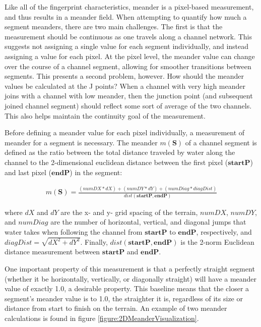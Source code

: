 Like all of the fingerprint characteristics, meander is a pixel-based measurement, and thus results in a meander field. When attempting to quantify how much a segment meanders, there are two main challenges. The first is that the measurement should be continuous as one travels along a channel network. This suggests not assigning a single value for each segment individually, and instead assigning a value for each pixel. At the pixel level, the meander value can change over the course of a channel segment, allowing for smoother transitions between segments. This presents a second problem, however. How should the meander values be calculated at the J points? When a channel with very high meander joins with a channel with low meander, then the junction point (and subsequent joined channel segment) should reflect some sort of average of the two channels. This also helps maintain the continuity goal of the measurement.

Before defining a meander value for each pixel individually, a measurement of meander for a segment is necessary. The meander $m(\textbf{S})$ of a channel segment is defined as the ratio between the total distance traveled by water along the channel to the 2-dimensional euclidean distance between the first pixel ($\textbf{startP}$) and last pixel ($\textbf{endP}$) in the segment:

\begin{align}
\label{equation:MeanderCalculation}
  m(\textbf{S}) = \displaystyle\frac{ ( numDX * dX ) + ( numDY * dY ) + ( numDiag * diagDist) }{ dist( \textbf{startP}, \textbf{endP} ) }
\end{align}

\noindent where $dX$ and $dY$ are the x- and y- grid spacing of the terrain, $numDX$, $numDY$, and $numDiag$ are the number of horizontal, vertical, and diagonal jumps that water takes when following the channel from $\textbf{startP}$ to $\textbf{endP}$, respectively, and $diagDist = \sqrt{dX^{2} + dY^{2}}$. Finally, $dist(\textbf{startP}, \textbf{endP})$ is the 2-norm Euclidean distance measurement between $\textbf{startP}$ and $\textbf{endP}$.

One important property of this measurement is that a perfectly straight segment (whether it be horizontally, vertically, or diagonally straight) will have a meander value of exactly 1.0, a desirable property. This baseline means that the closer a segment's meander value is to 1.0, the straighter it is, regardless of its size or distance from start to finish on the terrain. An example of two meander calculations is found in figure \ref{figure:2DMeanderVisualization}.

